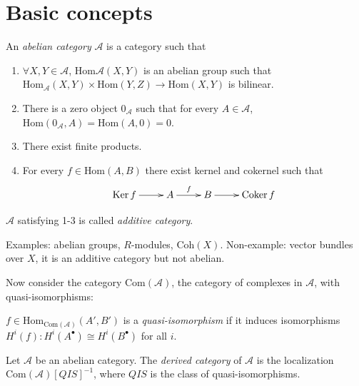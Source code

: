 \section{Basic concepts}

\begin{definition}
\label{definition-abelian-category}
An {\it abelian category} $\mathcal{A}$ is a category such that
\begin{enumerate}
\item $\forall X,Y \in \mathcal{A}$, $\text{Hom}{\mathcal{A}}(X,Y)$ is an
abelian group such that $\text{Hom}_{\mathcal{A}}(X,Y)\times\text{Hom}(Y,Z)\to
\text{Hom}(X,Y)$ is bilinear.
\item There is a zero object $0_{\mathcal{A}}$ such that for every $A \in
\mathcal{A}$, $\text{Hom}(0_{\mathcal{A}},A)=\text{Hom}(A,0)=0$.
\item There exist finite products.
\item For every  $f \in \text{Hom}(A,B)$ there exist kernel and cokernel such
that
$$
\xymatrix{
\Ker f\ar[r]&A\ar[r]^{f}&B\ar[r]&\Coker f
}
$$
\end{enumerate}
\end{definition}

\begin{definition}
\label{definition-additive-category}
$\mathcal{A}$ satisfying 1-3 is called  {\it additive category}.
\end{definition}

Examples: abelian groups, $R$-modules, $\text{Coh}(X)$. Non-example: vector
bundles over $X$, it is an additive category but not abelian.

\medskip\noindent

Now consider the category $\text{Com}(\mathcal{A})$, the category of complexes
in $\mathcal{A}$, with quasi-isomorphisms:

\begin{definition}
\label{definition-quasi-isomorphism}
$f\in \text{Hom}_{\text{Com}(\mathcal{A})}(A',B')$ is a {\it quasi-isomorphism}
if it induces isomorphisms $H^i(f):H^i(A^{\bullet})\cong H^i(B^{\bullet})$ for
all $i$.
\end{definition}

\begin{definition}
\label{definition-derived-category}
Let $\mathcal{A}$ be an abelian category. The {\it derived category} of
$\mathcal{A}$ is the localization $\text{Com}(\mathcal{A})[QIS]^{-1}$, where
$QIS$ is the class of quasi-isomorphisms.
\end{definition}

